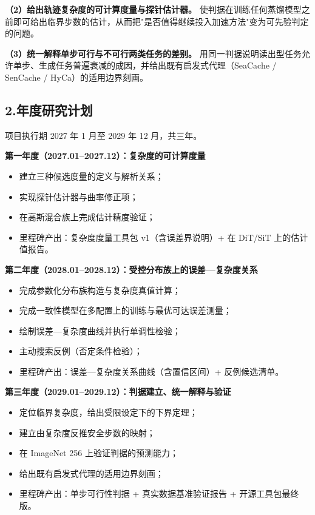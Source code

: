 \documentclass[12pt,a4paper]{ctexart}
\begin{document}
\textbf{（2）给出轨迹复杂度的可计算度量与探针估计器。} 使判据在训练任何蒸馏模型之前即可给出临界步数的估计，从而把"是否值得继续投入加速方法"变为可先验判定的问题。

\textbf{（3）统一解释单步可行与不可行两类任务的差别。} 用同一判据说明读出型任务允许单步、生成任务普遍衰减的成因，并给出既有启发式代理（SeaCache / SenCache / HyCa）的适用边界刻画。

\subsection*{2.年度研究计划}

项目执行期 2027 年 1 月至 2029 年 12 月，共三年。

\textbf{第一年度（2027.01–2027.12）：复杂度的可计算度量}

\begin{itemize}[leftmargin=2em,itemsep=2pt,topsep=3pt]
  \item 建立三种候选度量的定义与解析关系；
  \item 实现探针估计器与曲率修正项；
  \item 在高斯混合族上完成估计精度验证；
  \item 里程碑产出：复杂度度量工具包 v1（含误差界说明）+ 在 DiT/SiT 上的估计值报告。
\end{itemize}

\textbf{第二年度（2028.01–2028.12）：受控分布族上的误差—复杂度关系}

\begin{itemize}[leftmargin=2em,itemsep=2pt,topsep=3pt]
  \item 完成参数化分布族构造与复杂度真值计算；
  \item 完成一致性模型在多配置上的训练与最优可达误差测量；
  \item 绘制误差—复杂度曲线并执行单调性检验；
  \item 主动搜索反例（否定条件检验）；
  \item 里程碑产出：误差—复杂度关系曲线（含置信区间）+ 反例候选清单。
\end{itemize}

\textbf{第三年度（2029.01–2029.12）：判据建立、统一解释与验证}

\begin{itemize}[leftmargin=2em,itemsep=2pt,topsep=3pt]
  \item 定位临界复杂度，给出受限设定下的下界定理；
  \item 建立由复杂度反推安全步数的映射；
  \item 在 ImageNet 256 上验证判据的预测能力；
  \item 给出既有启发式代理的适用边界刻画；
  \item 里程碑产出：单步可行性判据 + 真实数据基准验证报告 + 开源工具包最终版。
\end{itemize}
\end{document}
